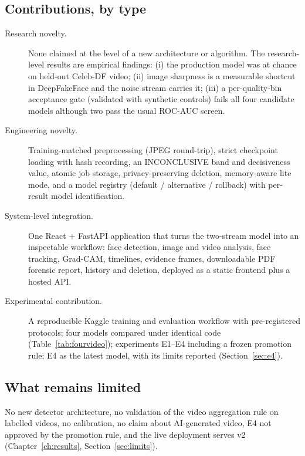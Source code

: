 \subsection{Contributions, by type}
\begin{description}
\item[Research novelty.] None claimed at the level of a new architecture or algorithm. The research-level results are empirical findings: (i) the production model was at chance on held-out Celeb-DF video; (ii) image sharpness is a measurable shortcut in DeepFakeFace and the noise stream carries it; (iii) a per-quality-bin acceptance gate (validated with synthetic controls) fails all four candidate models although two pass the usual ROC-AUC screen.
\item[Engineering novelty.] Training-matched preprocessing (JPEG round-trip), strict checkpoint loading with hash recording, an INCONCLUSIVE band and decisiveness value, atomic job storage, privacy-preserving deletion, memory-aware lite mode, and a model registry (default / alternative / rollback) with per-result model identification.
\item[System-level integration.] One React + FastAPI application that turns the two-stream model into an inspectable workflow: face detection, image and video analysis, face tracking, Grad-CAM, timelines, evidence frames, downloadable PDF forensic report, history and deletion, deployed as a static frontend plus a hosted API.
\item[Experimental contribution.] A reproducible Kaggle training and evaluation workflow with pre-registered protocols; four models compared under identical code (Table~\ref{tab:fourvideo}); experiments E1--E4 including a frozen promotion rule; E4 as the latest model, with its limits reported (Section~\ref{sec:e4}).
\end{description}

\subsection{What remains limited}
No new detector architecture, no validation of the video aggregation rule on labelled videos, no calibration, no claim about AI-generated video, E4 not approved by the promotion rule, and the live deployment serves v2 (Chapter~\ref{ch:results}, Section~\ref{sec:limits}).

